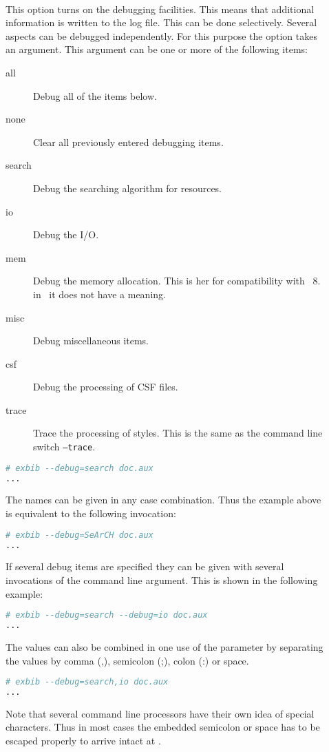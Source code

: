\begin{description}
\item[ ]
\item[ ]\ \\
  This option turns on the debugging facilities. This means that
  additional information is written to the log file.  This can be done
  selectively. Several aspects can be debugged independently. For this
  purpose the option takes an argument. This argument can be one or
  more of the following items:
  \begin{description}
  \item[all] 
    Debug all of the items below.
  \item[none] 
    Clear all previously entered debugging items.
  \item[search]
    Debug the searching algorithm for resources.
  \item[io] 
    Debug the I/O.
  \item[mem] Debug the memory allocation. This is her for
    compatibility with \BibTeX~8. in \ExBib\ it does not have a meaning.
  \item[misc] 
    Debug miscellaneous items.
  \item[csf] 
    Debug the processing of CSF files.
  \item[trace] 
    Trace the processing of styles. This is the same as the command
    line switch \texttt{--trace}.
  \end{description}
\begin{lstlisting}[language=sh]
# exbib --debug=search doc.aux
...
\end{lstlisting}
The names can be given in any case combination. Thus the example above
is equivalent to the following invocation:
\begin{lstlisting}[language=sh]
# exbib --debug=SeArCH doc.aux
...
\end{lstlisting}
If several debug items are specified they can be given with several
invocations of the command line argument. This is shown in the
following example:
\begin{lstlisting}[language=sh]
# exbib --debug=search --debug=io doc.aux
...
\end{lstlisting}
The values can also be combined in one use of the parameter by
separating the values by comma (,), semicolon (;), colon (:) or space.
\begin{lstlisting}[language=sh]
# exbib --debug=search,io doc.aux
...
\end{lstlisting}

Note that several command line processors have their own idea of
special characters. Thus in most cases the embedded semicolon or space
has to be escaped properly to arrive intact at \ExBib.

\end{description}

